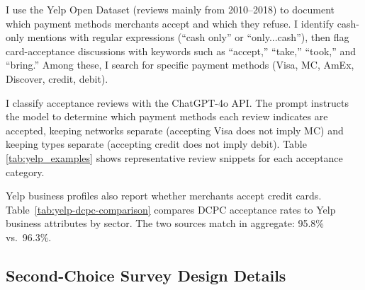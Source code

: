 \documentclass[main.tex]{subfiles}
\begin{document}
I use the Yelp Open Dataset (reviews mainly from 2010--2018) to document which payment methods merchants accept and which they refuse.
I identify cash-only mentions with regular expressions (``cash only'' or ``only...cash''), then flag card-acceptance discussions with keywords such as ``accept,'' ``take,'' ``took,'' and ``bring.''
Among these, I search for specific payment methods (Visa, MC, AmEx, Discover, credit, debit).

I classify acceptance reviews with the ChatGPT-4o API.
The prompt instructs the model to determine which payment methods each review indicates are accepted, keeping networks separate (accepting Visa does not imply MC) and keeping types separate (accepting credit does not imply debit).
Table \ref{tab:yelp_examples} shows representative review snippets for each acceptance category.

\begin{table}[ht!]
\caption{Examples of Yelp reviews}
\label{tab:yelp_examples}
    \centering
    
\end{table}

Yelp business profiles also report whether merchants accept credit cards.
Table~\ref{tab:yelp-dcpc-comparison} compares DCPC acceptance rates to Yelp business attributes by sector.
The two sources match in aggregate: 95.8\% vs.\ 96.3\%.

\begin{table}[htbp]
\centering
\caption{DCPC and Yelp acceptance rates by sector \label{tab:yelp-dcpc-comparison}}

\end{table}

\subsection{Second-Choice Survey Design Details}
\label{subsec:appendix-second-choice-details}
\end{document}

